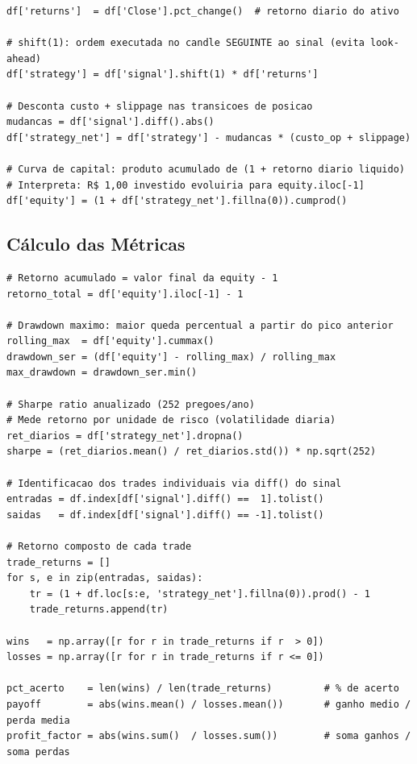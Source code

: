 \documentclass[12pt, a4paper]{article}
\begin{document}
\begin{lstlisting}[caption={Cálculo dos retornos líquidos e curva de capital.}]
df['returns']  = df['Close'].pct_change()  # retorno diario do ativo

# shift(1): ordem executada no candle SEGUINTE ao sinal (evita look-ahead)
df['strategy'] = df['signal'].shift(1) * df['returns']

# Desconta custo + slippage nas transicoes de posicao
mudancas = df['signal'].diff().abs()
df['strategy_net'] = df['strategy'] - mudancas * (custo_op + slippage)

# Curva de capital: produto acumulado de (1 + retorno diario liquido)
# Interpreta: R$ 1,00 investido evoluiria para equity.iloc[-1]
df['equity'] = (1 + df['strategy_net'].fillna(0)).cumprod()
\end{lstlisting}

\subsection{Cálculo das Métricas}

\begin{lstlisting}[caption={Métricas de desempenho calculadas para cada ativo.}]
# Retorno acumulado = valor final da equity - 1
retorno_total = df['equity'].iloc[-1] - 1

# Drawdown maximo: maior queda percentual a partir do pico anterior
rolling_max  = df['equity'].cummax()
drawdown_ser = (df['equity'] - rolling_max) / rolling_max
max_drawdown = drawdown_ser.min()

# Sharpe ratio anualizado (252 pregoes/ano)
# Mede retorno por unidade de risco (volatilidade diaria)
ret_diarios = df['strategy_net'].dropna()
sharpe = (ret_diarios.mean() / ret_diarios.std()) * np.sqrt(252)

# Identificacao dos trades individuais via diff() do sinal
entradas = df.index[df['signal'].diff() ==  1].tolist()
saidas   = df.index[df['signal'].diff() == -1].tolist()

# Retorno composto de cada trade
trade_returns = []
for s, e in zip(entradas, saidas):
    tr = (1 + df.loc[s:e, 'strategy_net'].fillna(0)).prod() - 1
    trade_returns.append(tr)

wins   = np.array([r for r in trade_returns if r  > 0])
losses = np.array([r for r in trade_returns if r <= 0])

pct_acerto    = len(wins) / len(trade_returns)         # % de acerto
payoff        = abs(wins.mean() / losses.mean())       # ganho medio / perda media
profit_factor = abs(wins.sum()  / losses.sum())        # soma ganhos / soma perdas
\end{lstlisting}
\end{document}
